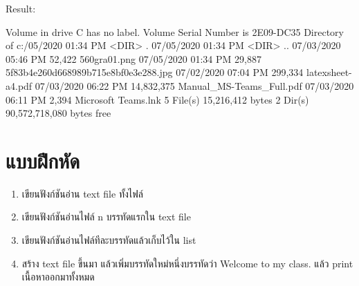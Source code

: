 Result:
\begin{codelist}{}{}
Volume in drive C has no label.
Volume Serial Number is 2E09-DC35
Directory of c:\users\janta{}/05/2020  01:34 PM    <DIR>          .
07/05/2020  01:34 PM    <DIR>          ..
07/03/2020  05:46 PM            52,422 560gra01.png
07/05/2020  01:34 PM            29,887 5f83b4e260d668989b715e8bf0e3e288.jpg
07/02/2020  07:04 PM           299,334 latexsheet-a4.pdf
07/03/2020  06:22 PM        14,832,375 Manual_MS-Teams_Full.pdf
07/03/2020  06:11 PM             2,394 Microsoft Teams.lnk
               5 File(s)     15,216,412 bytes
               2 Dir(s)  90,572,718,080 bytes free
\end{codelist}



\section{แบบฝึกหัด}
\begin{enumerate} 
\item 	เขียนฟังก์ชันอ่าน text file ทั้งไฟล์
\item 	เขียนฟังก์ชันอ่านไฟล์ n บรรทัดแรกใน text file
\item 	เขียนฟังก์ชันอ่านไฟล์ทีละบรรทัดแล้วเก็บไว้ใน list
\item 	สร้าง text file ขึ้นมา แล้วเพิ่มบรรทัดใหม่หนึ่งบรรทัดว่า Welcome to my class. แล้ว print เนื้อหาออกมาทั้งหมด
\end{enumerate}



